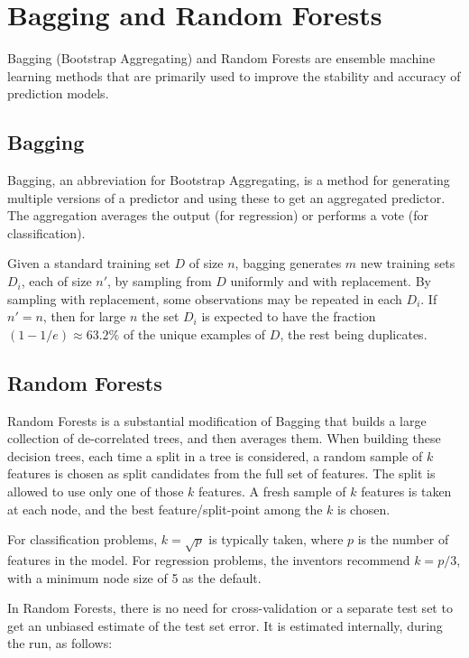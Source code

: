 \chapter{Bagging and Random Forests}

Bagging (Bootstrap Aggregating) and Random Forests are ensemble
machine learning methods that are primarily used to improve the
stability and accuracy of prediction models.

\section{Bagging}

Bagging, an abbreviation for Bootstrap Aggregating, is a method for
generating multiple versions of a predictor and using these to get an
aggregated predictor. The aggregation averages the output (for
regression) or performs a vote (for classification). 

Given a standard training set $D$ of size $n$, bagging generates $m$
new training sets $D_i$, each of size $n'$, by sampling from $D$
uniformly and with replacement. By sampling with replacement, some
observations may be repeated in each $D_i$. If $n'=n$, then for large
$n$ the set $D_i$ is expected to have the fraction $(1 - 1/e) \approx
63.2\%$ of the unique examples of $D$, the rest being duplicates.

\section{Random Forests}

Random Forests is a substantial modification of Bagging that builds a
large collection of de-correlated trees, and then averages them. When
building these decision trees, each time a split in a tree is
considered, a random sample of $k$ features is chosen as split
candidates from the full set of features. The split is allowed to use
only one of those $k$ features. A fresh sample of $k$ features is
taken at each node, and the best feature/split-point among the $k$ is
chosen.

For classification problems, $k = \sqrt{p}$ is typically taken, where
$p$ is the number of features in the model. For regression problems,
the inventors recommend $k = p/3$, with a minimum node size of 5 as
the default.

In Random Forests, there is no need for cross-validation or a separate
test set to get an unbiased estimate of the test set error. It is
estimated internally, during the run, as follows:

